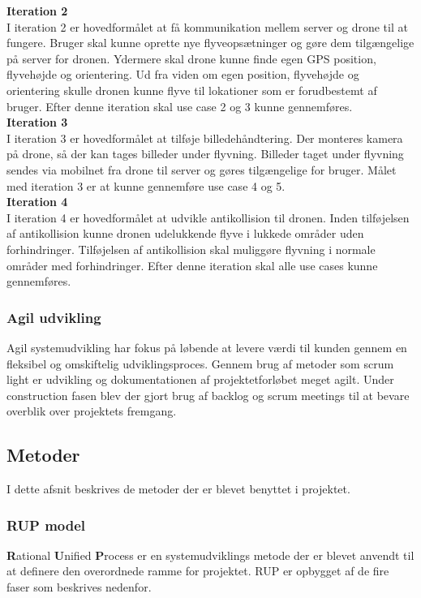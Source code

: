 \textbf{Iteration 2}\\
I iteration 2 er hovedformålet at få kommunikation mellem server og drone til at fungere. Bruger skal kunne oprette nye flyveopsætninger og gøre dem tilgængelige på server for dronen. Ydermere skal drone kunne finde egen GPS position, flyvehøjde og orientering. Ud fra viden om egen position, flyvehøjde og orientering skulle dronen kunne flyve til lokationer som er forudbestemt af bruger. Efter denne iteration skal use case 2 og 3 kunne gennemføres. \\

\textbf{Iteration 3}\\
I iteration 3 er hovedformålet at tilføje billedehåndtering. Der monteres kamera på drone, så der kan tages billeder under flyvning. Billeder taget under flyvning sendes via mobilnet fra drone til server og gøres tilgængelige for bruger. Målet med iteration 3 er at kunne gennemføre use case 4 og 5. \\

\textbf{Iteration 4}\\
I iteration 4 er hovedformålet at udvikle antikollision til dronen. Inden tilføjelsen af antikollision kunne dronen udelukkende flyve i lukkede områder uden forhindringer. Tilføjelsen af antikollision skal muliggøre flyvning i normale områder med forhindringer. Efter denne iteration skal alle use cases kunne gennemføres.


\subsubsection*{Agil udvikling}
Agil systemudvikling har fokus på løbende at levere værdi til kunden gennem en fleksibel og omskiftelig udviklingsproces. Gennem brug af metoder som scrum light er udvikling og dokumentationen af projektetforløbet meget agilt. Under construction fasen blev der gjort brug af backlog og scrum meetings til at bevare overblik over projektets fremgang.


\newpage
\subsection{Metoder}
I dette afsnit beskrives de metoder der er blevet benyttet i projektet.

\subsubsection*{RUP model}
\textbf{R}ational \textbf{U}nified \textbf{P}rocess er en systemudviklings metode der er blevet anvendt til at definere den overordnede ramme for projektet. RUP er opbygget af de fire faser som beskrives nedenfor.  

